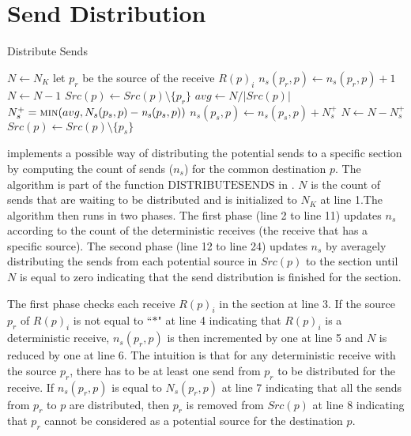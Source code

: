 \section{Send Distribution}

\begin{algorithm}
\caption{Distribute Sends}\label{algo:distribute}
\begin{algorithmic}[1]
\State $N\gets N_K$
\State let $p_{r}$ be the source of the receive $R(p)_i$
\State $\mathit{n_s}(p_{r},p)\gets \mathit{n_s}(p_{r},p)+1$
\State $N\gets N-1$   
\State $Src(p)\gets Src(p)\setminus\{p_{r}\}$
\EndIf
\EndIf
\EndFor
\State $\mathit{avg}\gets N / {|Src(p)|}$
\State $N_s^+ = \Call{min}{avg,N_s(p_{s},p)-\mathit{n_s}(p_{s},p)}$
\State $\mathit{n_s}(p_{s},p)\gets\mathit{n_s}(p_{s},p)+N_s^+$
\State $N\gets N-N_s^+$
\State $Src(p)\gets Src(p)\setminus\{p_{s}\}$
\EndIf
\EndIf
\EndFor
\EndWhile
\end{algorithmic}
\end{algorithm}


 implements a possible way of distributing the potential sends to a specific section by computing the count of sends ($n_s$) for the common destination $p$. The algorithm is part of the function $\mathrm{DISTRIBUTESENDS}$ in . $N$ is the count of sends that are waiting to be distributed and is initialized to $N_K$ at line 1.The algorithm then runs in two phases. The first phase (line 2 to line 11) updates $n_s$ according to the count of the deterministic receives (the receive that has a specific source). The second phase (line 12 to line 24) updates $n_s$ by averagely distributing the sends from each potential source in $Src(p)$ to the section until $N$ is equal to zero indicating that the send distribution is finished for the section. 

The first phase checks each receive $R(p)_i$ in the section at line 3. If the source $p_r$ of $R(p)_i$ is not equal to ``$\ast$" at line 4 indicating that $R(p)_i$ is a deterministic receive, $n_s(p_r,p)$ is then incremented by one at line 5 and $N$ is reduced by one at line 6. The intuition is that for any deterministic receive with the source $p_r$, there has to be at least one send from $p_r$ to be distributed for the receive. If $n_s(p_r,p)$ is equal to $N_s(p_r,p)$ at line 7 indicating that all the sends from $p_r$ to $p$ are distributed, then $p_r$ is removed from $Src(p)$ at line 8 indicating that $p_r$ cannot be considered as a potential source for the destination $p$. 

